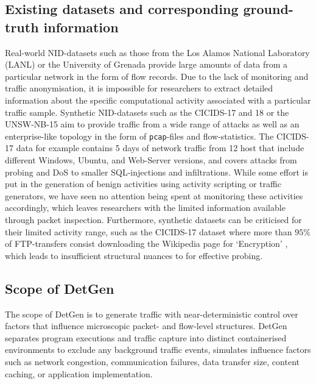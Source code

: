 \documentclass[runningheads]{llncs}
\begin{document}
\subsection{Existing datasets and corresponding ground-truth information}\label{Sec:ExData}

Real-world NID-datasets such as those from the Los Alamos National Laboratory \cite{kent-2015-cyberdata1} (LANL) or the University of Grenada \cite{macia2018ugr} provide large amounts of data from a particular network in the form of flow records. Due to the lack of monitoring and traffic anonymisation, it is impossible for researchers to extract detailed information about the specific computational activity associated with a particular traffic sample.
Synthetic NID-datasets such as the CICIDS-17 and 18 \cite{sharafaldin2018toward} or the UNSW-NB-15 \cite{moustafa2015unsw} aim to provide traffic from a wide range of attacks as well as an enterprise-like topology in the form of \texttt{pcap}-files and flow-statistics. The CICIDS-17 data for example contains 5 days of network traffic from 12 host that include different Windows, Ubuntu, and Web-Server versions, and covers attacks from probing and DoS to smaller SQL-injections and infiltrations.
While some effort is put in the generation of benign activities using activity scripting or traffic generators, we have seen no attention being spent at monitoring these activities accordingly, which leaves researchers with the limited information available through packet inspection. Furthermore, synthetic datasets can be criticised for their limited activity range, such as the CICIDS-17 dataset where more than $95\%$ of FTP-transfers consist downloading the Wikipedia page for ‘Encryption’ \cite{ring2019survey}, which leads to insufficient structural nuances to for effective probing.


\subsection{Scope of DetGen}

The scope of DetGen is to generate traffic with near-deterministic control over factors that influence microscopic packet- and flow-level structures. DetGen separates program executions and traffic capture into distinct containerised environments to exclude any background traffic events, simulates influence factors such as network congestion, communication failures, data transfer size, content caching, or application implementation. %
\end{document}
